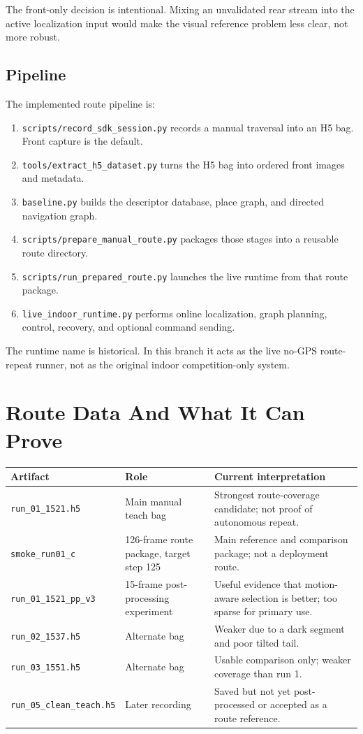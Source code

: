 \documentclass[11pt]{article}
\begin{document}
The front-only decision is intentional. Mixing an unvalidated rear stream into
the active localization input would make the visual reference problem less
clear, not more robust.

\subsection{Pipeline}

The implemented route pipeline is:

\begin{enumerate}[nosep]
  \item \texttt{scripts/record\_sdk\_session.py} records a manual traversal into
  an H5 bag. Front capture is the default.
  \item \texttt{tools/extract\_h5\_dataset.py} turns the H5 bag into ordered
  front images and metadata.
  \item \texttt{baseline.py} builds the descriptor database, place graph, and
  directed navigation graph.
  \item \texttt{scripts/prepare\_manual\_route.py} packages those stages into a
  reusable route directory.
  \item \texttt{scripts/run\_prepared\_route.py} launches the live runtime from
  that route package.
  \item \texttt{live\_indoor\_runtime.py} performs online localization, graph
  planning, control, recovery, and optional command sending.
\end{enumerate}

The runtime name is historical. In this branch it acts as the live no-GPS
route-repeat runner, not as the original indoor competition-only system.

\section{Route Data And What It Can Prove}

\begin{longtable}{p{}p{}p{}}
\toprule
\textbf{Artifact} & \textbf{Role} & \textbf{Current interpretation} \\
\midrule
\texttt{run\_01\_1521.h5} & Main manual teach bag & Strongest route-coverage candidate; not proof of autonomous repeat. \\
\texttt{smoke\_run01\_c} & 126-frame route package, target step 125 & Main reference and comparison package; not a deployment route. \\
\texttt{run\_01\_1521\_pp\_v3} & 15-frame post-processing experiment & Useful evidence that motion-aware selection is better; too sparse for primary use. \\
\texttt{run\_02\_1537.h5} & Alternate bag & Weaker due to a dark segment and poor tilted tail. \\
\texttt{run\_03\_1551.h5} & Alternate bag & Usable comparison only; weaker coverage than run 1. \\
\texttt{run\_05\_clean\_teach.h5} & Later recording & Saved but not yet post-processed or accepted as a route reference. \\
\bottomrule
\end{longtable}
\end{document}
